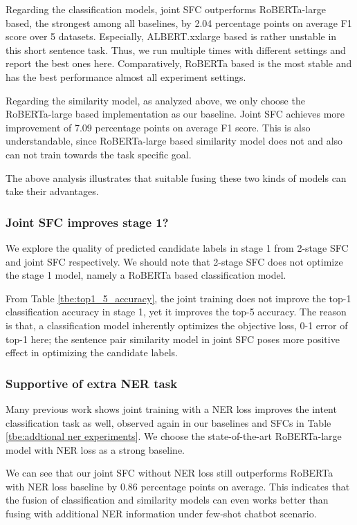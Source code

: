 Regarding the classification models, joint SFC outperforms RoBERTa-large based, the strongest among all baselines, by 2.04 percentage points on average F1 score over 5 datasets. 
Especially, ALBERT.xxlarge based is rather unstable in this short sentence task. 
Thus, we run multiple times with different settings and report the best ones here. 
Comparatively, RoBERTa based is the most stable and has the best performance almost all experiment settings.

Regarding the similarity model, as analyzed above, we only choose the RoBERTa-large based implementation as our baseline. 
Joint SFC achieves more improvement of 7.09 percentage points on average F1 score. 
This is also understandable, since RoBERTa-large based similarity model does not and also can not train towards the task specific goal.

The above analysis illustrates that suitable fusing these two kinds of models can take their advantages.

\subsubsection*{Joint SFC improves stage 1?}
We explore the quality of predicted candidate labels in stage 1 from 2-stage SFC and joint SFC respectively. 
We should note that 2-stage SFC does not optimize the stage 1 model, namely a RoBERTa based classification model.

From Table \ref{tbe:top1_5_accuracy}, the joint training does not improve the top-1 classification accuracy in stage 1, yet it improves the top-5 accuracy.
The reason is that, a classification model inherently optimizes the objective loss, 0-1 error of top-1 here; the sentence pair similarity model in joint SFC poses more positive effect in optimizing the candidate labels.

\subsubsection*{Supportive of extra NER task}
Many previous work shows joint training with a NER loss improves the intent classification task as well, observed again in our baselines and SFCs in Table \ref{tbe:addtional ner experiments}.
We choose the state-of-the-art RoBERTa-large model with NER loss as a strong baseline. 

We can see that our joint SFC without NER loss still outperforms RoBERTa with NER loss baseline by 0.86 percentage points on average. 
This indicates that the fusion of classification and similarity models can even works better than fusing with additional NER information under few-shot chatbot scenario. 

